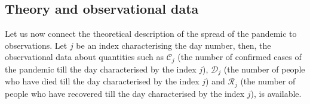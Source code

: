 \documentclass[aps,prd,10pt,twocolumn,nofootinbib]{revtex4-2}
\begin{document}
\subsection{Theory and observational data}
\label{sec:theory_obs}

Let us now connect the theoretical description of the spread of the pandemic to observations.
Let $j$ be an index characterising the day number, then, the observational data about quantities such as 
$\mathscr{C}_j$ (the number of confirmed cases of the pandemic till the day characterised by the index $j$), 
$\mathscr{D}_j$ (the number of people who have died till the day characterised by the index $j$) and $\mathscr{R}_j$ (the number of people who have recovered till the day characterised by the index $j$), is available. 
\end{document}
